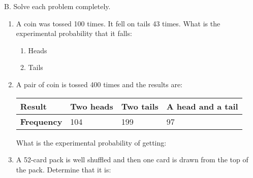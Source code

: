 
B. Solve each problem completely.

\begin{enumerate} 
\item A coin was tossed 100 times. It fell on tails 43 times. What is the experimental probability that it falls: 
\begin{enumerate}
\item   Heads
\item   Tails
\end{enumerate}   
\item A pair of coin is tossed 400 times and the results are:

\vspace*{-1.5ex}
\begin{center}

\noindent\begin{minipage}{0.45\textwidth}
\small
\begin{tabularx}{\textwidth}{|Y|Y|Y|Y|}
\hline
\textbf{Result} & Two heads & Two tails & A head and a tail\\
\hline
\textbf{Frequency} & 104 & 199 & 97\\
\hline
\end{tabularx} 
\end{minipage}
\end{center} 

\nextcolumn

What is the experimental probability of getting: 
\begin{enumerate}
\end{enumerate} 

\item A 52-card pack is well shuffled and then one card is drawn from the top of the pack. Determine that it is: 
\begin{enumerate}
\end{enumerate} 


\end{enumerate}
